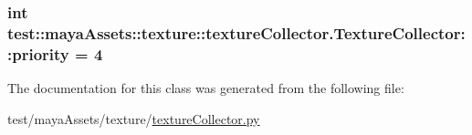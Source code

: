 \hypertarget{classtest_1_1mayaAssets_1_1texture_1_1textureCollector_1_1TextureCollector_adf2db616fa4b6180b9f08b2cde3a9c16}{
\subsubsection[{priority}]{\setlength{\rightskip}{0pt plus 5cm}int {\bf test\-::maya\-Assets\-::texture\-::texture\-Collector.\-Texture\-Collector\-::priority} = 4}}\label{d3/df4/classtest_1_1mayaAssets_1_1texture_1_1textureCollector_1_1TextureCollector_adf2db616fa4b6180b9f08b2cde3a9c16}


\-The documentation for this class was generated from the following file\-:\begin{DoxyCompactItemize}
\item 
test/maya\-Assets/texture/\hyperlink{textureCollector_8py}{texture\-Collector.\-py}\end{DoxyCompactItemize}
